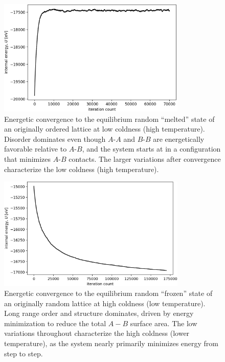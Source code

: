 \documentclass[10pt]{article}
\begin{document}
\begin{figure}[h!]
\centering
\includegraphics[width=0.80\textwidth]{Figures/verification_melted_convergence.png}
\caption{Energetic convergence to the equilibrium random ``melted'' state of an originally ordered lattice at low coldness (high temperature).
Disorder dominates even though $A$-$A$ and $B$-$B$ are energetically favorable relative to $A$-$B$, and the system starts at in a configuration that minimizes $A$-$B$ contacts.
The larger variations after convergence characterize the low coldness (high temperature).}
\label{fig:melted_convergence}
\end{figure}

\begin{figure}[h!]
\centering
\includegraphics[width=0.80\textwidth]{Figures/verification_frozen_convergence.png}
\caption{Energetic convergence to the equilibrium random ``frozen'' state of an originally random lattice at high coldness (low temperature).
Long range order and structure dominates, driven by energy minimization to reduce the total $A-B$ surface area.
The low variations throughout characterize the high coldness (lower temperature), as the system nearly primarily minimizes energy from step to step.}
\label{fig:frozen_convergence}
\end{figure}


\clearpage

\end{document}
